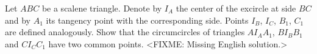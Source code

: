 \problem
Let $ABC$ be a scalene triangle.
Denote by $I_A$ the center of the excircle at side $BC$ and by $A_1$ its
tangency point with the corresponding side.
Points $I_B$, $I_C$, $B_1$, $C_1$ are defined analogously.
Show that the circumcircles of triangles $A I_A A_1$, $B I_B B_1$ and
$C I_C C_1$ have two common points.
\solution
<FIXME: Missing English solution.>
\endproblem
